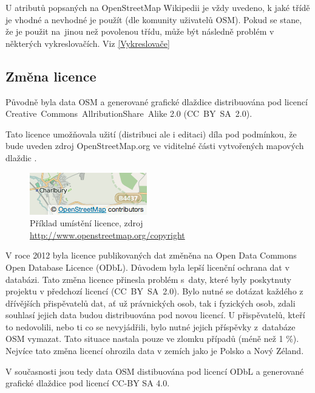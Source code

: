 U atributů popsaných na OpenStreetMap Wikipedii \cite{OSMfeatures} je vždy uvedeno, k jaké třídě je
vhodné a nevhodné je použít (dle komunity uživatelů OSM). Pokud se stane, že je použit
na~jinou než povolenou třídu, může být následně problém v některých vykreslovačích. 
Viz \ref{Vykreslovače}

\subsection{Změna licence}
\label{změna licence}

Původně byla data OSM a generované grafické dlaždice distribuována pod licencí
Creative~Commons~AllributionShare~Alike 2.0 (CC~BY~SA~2.0).

Tato licence umožňovala užití (distribuci ale i editaci) díla pod podmínkou,
že bude uveden zdroj OpenStreetMap.org ve viditelné části
vytvořených mapových dlaždic \cite{OSMlicence}.

  \begin{figure}[hbt]
    \centering
      \includegraphics[scale=0.75]{./pictures/attribution_example.png}
      \caption{Příklad umístění licence,
                zdroj \url{http://www.openstreetmap.org/copyright}}
      \label{fig:attribution_example}
  \end{figure} 

V roce 2012 byla licence publikovaných dat změněna na Open Data Commons
Open Database Licence (ODbL).
Důvodem byla lepší licenční ochrana dat v databázi. \cite{OSMlicenceChange}
Tato změna licence přinesla problém
s~daty, které byly poskytnuty projektu v předchozí licencí
(CC~BY~SA~2.0). Bylo nutné se dotázat každého z dřívějších
přispěvatelů dat, ať už právnických osob, tak i fyzických osob, zdali
souhlasí jejich data budou distribuována pod novou licencí.
U přispěvatelů, kteří to nedovolili, nebo ti co se nevyjádřili,
bylo nutné jejich příspěvky z~databáze OSM vymazat.
Tato situace nastala pouze ve zlomku případů (méně než 1 \%).
Nejvíce tato změna licencí ohrozila data v zemích jako je Polsko a Nový Zéland. \cite {OSMlicenceIssue}

V současnosti jsou tedy data OSM distibuována pod licencí ODbL a
generované grafické dlaždice pod licencí CC-BY SA 4.0. \cite{OSMlicence}

